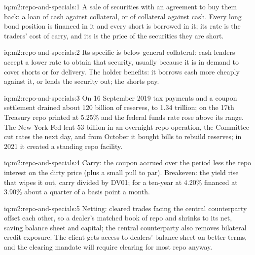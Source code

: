 \begin{solution}{iq:m2:repo-and-specials:1}
A sale of securities with an agreement to buy them back: a loan of cash against
collateral, or of collateral against cash. Every long bond position is
financed in it and every short is borrowed in it; its rate is the traders'
cost of carry, and its  is the price of the securities they are
short.
\end{solution}

\begin{solution}{iq:m2:repo-and-specials:2}
Its specific  is below general collateral: cash lenders accept a
lower rate to obtain that security, usually because it is in demand to cover
shorts or for delivery. The holder benefits: it borrows cash more cheaply
against it, or lends the security out; the shorts pay.
\end{solution}

\begin{solution}{iq:m2:repo-and-specials:3}
On 16 September 2019 tax payments and a coupon settlement drained about 120
billion of reserves, to 1.34 trillion; on the 17th Treasury repo printed at
5.25\% and the federal funds rate rose above its range. The New York Fed
lent 53 billion in an overnight repo operation, the Committee cut rates the
next day, and from October it bought bills to rebuild reserves; in 2021 it
created a standing repo facility.
\end{solution}

\begin{solution}{iq:m2:repo-and-specials:4}
Carry: the coupon accrued over the period less the repo interest on the
dirty price (plus a small pull to par). Breakeven: the yield rise that wipes it
out, carry divided by DV01; for a ten-year at 4.20\% financed at 3.90\% about a
quarter of a basis point a month.
\end{solution}

\begin{solution}{iq:m2:repo-and-specials:5}
Netting: cleared trades facing the central counterparty offset each other, so
a dealer's matched book of repo and  shrinks to its net, saving
balance sheet and capital; the central counterparty also removes bilateral
credit exposure. The client gets access to dealers' balance sheet on better
terms, and the clearing mandate will require clearing for most repo anyway.
\end{solution}


